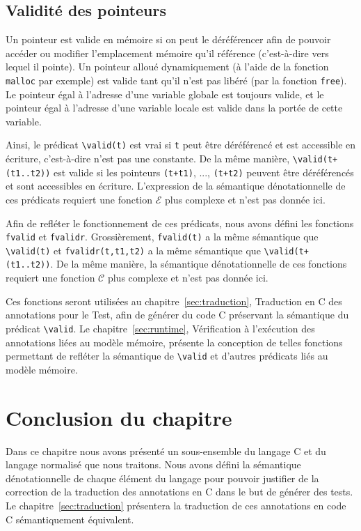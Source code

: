 \subsection{Validité des pointeurs}
\label{sec:ptr-valid}
Un pointeur est valide en mémoire si on peut le déréférencer afin de pouvoir
accéder ou modifier l'emplacement mémoire qu'il référence (c'est-à-dire vers
lequel il pointe).
Un pointeur alloué dynamiquement (à l'aide de la fonction \lstinline'malloc' par
exemple) est valide tant qu'il n'est pas libéré (par la fonction
\lstinline'free').
Le pointeur égal à l'adresse d'une variable globale est toujours valide, et le
pointeur égal à l'adresse d'une variable locale est valide dans la portée de
cette variable.

Ainsi, le prédicat \lstinline'\valid(t)' est vrai si \lstinline't'
peut être déréférencé et est accessible en écriture, c'est-à-dire n'est pas une
constante.
De la même manière, \lstinline'\valid(t+(t1..t2))' est valide si les pointeurs
\lstinline'(t+t1)', ..., \lstinline'(t+t2)' peuvent être déréférencés et sont
accessibles en écriture.
L'expression de la sémantique dénotationnelle de ces prédicats requiert une
fonction $\mathcal{E}$ plus complexe et n'est pas donnée ici.

Afin de refléter le fonctionnement de ces prédicats, nous avons défini les
fonctions \lstinline'fvalid' et \lstinline'fvalidr'.
Grossièrement, \lstinline'fvalid(t)' a la même sémantique que
\lstinline'\valid(t)' et \lstinline'fvalidr(t,t1,t2)' a la même sémantique que
\lstinline'\valid(t+(t1..t2))'.
De la même manière, la sémantique dénotationnelle de ces fonctions requiert une
fonction $\mathcal{C}$ plus complexe et n'est pas donnée ici.

Ces fonctions seront utilisées au chapitre~\ref{sec:traduction}, Traduction en
C des annotations pour le Test, afin de générer du code C préservant la
sémantique du prédicat \lstinline'\valid'.
Le chapitre~\ref{sec:runtime}, Vérification à l'exécution des annotations liées
au modèle mémoire, présente la conception de telles fonctions permettant de
refléter la sémantique de \lstinline'\valid' et d'autres prédicats \eacsl liés
au modèle mémoire.


\section*{Conclusion du chapitre}

Dans ce chapitre nous avons présenté un sous-ensemble du langage C et du
langage \eacsl normalisé que nous traitons.
Nous avons défini la sémantique dénotationnelle de chaque élément du langage
pour pouvoir justifier de la correction de la traduction des annotations en C
dans le but de générer des tests.
Le chapitre~\ref{sec:traduction} présentera la traduction de ces annotations
\eacsl en code C sémantiquement équivalent.
